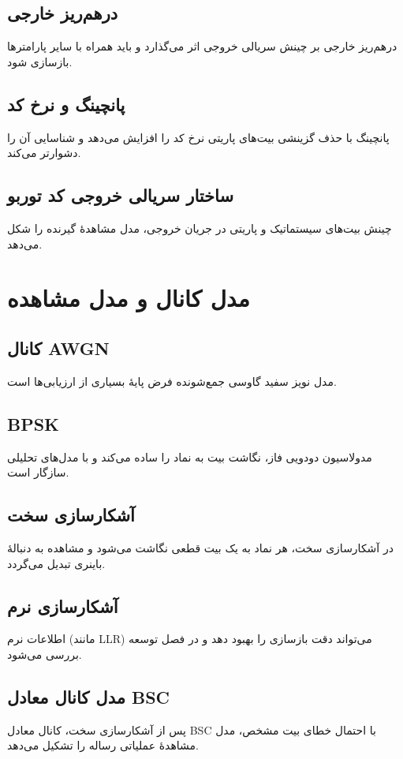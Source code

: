 \subsection{درهم‌ریز خارجی}
درهم‌ریز خارجی بر چینش سریالی خروجی اثر می‌گذارد و باید همراه با سایر پارامترها بازسازی شود.

\subsection{پانچینگ و نرخ کد}
پانچینگ با حذف گزینشی بیت‌های پاریتی نرخ کد را افزایش می‌دهد و شناسایی آن را دشوارتر می‌کند.

\subsection{ساختار سریالی خروجی کد توربو}
چینش بیت‌های سیستماتیک و پاریتی در جریان خروجی، مدل مشاهدهٔ گیرنده را شکل می‌دهد.

\section{مدل کانال و مدل مشاهده}
\subsection{کانال AWGN}
مدل نویز سفید گاوسی جمع‌شونده فرض پایهٔ بسیاری از ارزیابی‌ها است.

\subsection{BPSK}
مدولاسیون دودویی فاز، نگاشت بیت به نماد را ساده می‌کند و با مدل‌های تحلیلی سازگار است.

\subsection{آشکارسازی سخت}
در آشکارسازی سخت، هر نماد به یک بیت قطعی نگاشت می‌شود و مشاهده به دنبالهٔ باینری تبدیل می‌گردد.

\subsection{آشکارسازی نرم}
اطلاعات نرم (مانند LLR) می‌تواند دقت بازسازی را بهبود دهد و در فصل توسعه بررسی می‌شود.

\subsection{مدل کانال معادل BSC}
پس از آشکارسازی سخت، کانال معادل BSC با احتمال خطای بیت مشخص، مدل مشاهدهٔ عملیاتی رساله را تشکیل می‌دهد.

